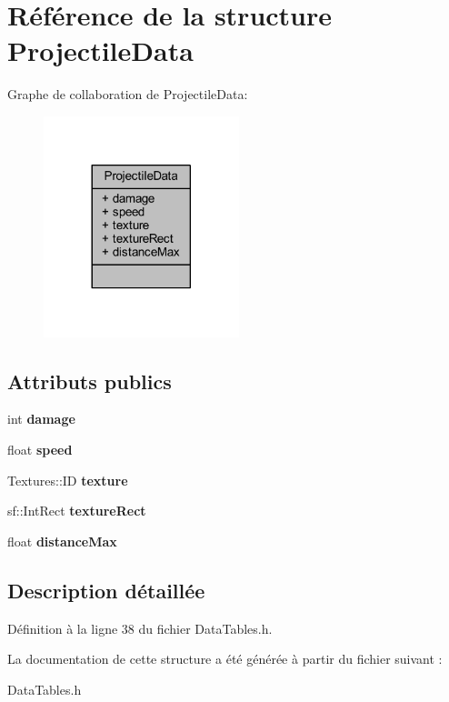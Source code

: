 \hypertarget{struct_projectile_data}{}\section{Référence de la structure Projectile\+Data}
\label{struct_projectile_data}


Graphe de collaboration de Projectile\+Data\+:\nopagebreak
\begin{figure}[H]
\begin{center}
\leavevmode
\includegraphics[width=161pt]{struct_projectile_data__coll__graph}
\end{center}
\end{figure}
\subsection*{Attributs publics}
\begin{DoxyCompactItemize}
\item 
\hypertarget{struct_projectile_data_add13e5536e407fa142dc8dc1dea3959b}{}\label{struct_projectile_data_add13e5536e407fa142dc8dc1dea3959b} 
int {\bfseries damage}
\item 
\hypertarget{struct_projectile_data_ad5203e5d2fccba6c543de57d1e9070d5}{}\label{struct_projectile_data_ad5203e5d2fccba6c543de57d1e9070d5} 
float {\bfseries speed}
\item 
\hypertarget{struct_projectile_data_af72f694e0c4ef9fa6e034167a32592f9}{}\label{struct_projectile_data_af72f694e0c4ef9fa6e034167a32592f9} 
Textures\+::\+ID {\bfseries texture}
\item 
\hypertarget{struct_projectile_data_ac238749d31e6643852ac04cee0413f34}{}\label{struct_projectile_data_ac238749d31e6643852ac04cee0413f34} 
sf\+::\+Int\+Rect {\bfseries texture\+Rect}
\item 
\hypertarget{struct_projectile_data_acb3ea5370582ce46d06302ba98c90ff2}{}\label{struct_projectile_data_acb3ea5370582ce46d06302ba98c90ff2} 
float {\bfseries distance\+Max}
\end{DoxyCompactItemize}


\subsection{Description détaillée}


Définition à la ligne 38 du fichier Data\+Tables.\+h.



La documentation de cette structure a été générée à partir du fichier suivant \+:\begin{DoxyCompactItemize}
\item 
Data\+Tables.\+h\end{DoxyCompactItemize}

